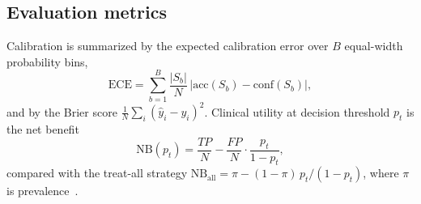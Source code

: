 \documentclass[conference]{IEEEtran}
\begin{document}
\subsection{Evaluation metrics}
Calibration is summarized by the expected calibration error over $B$ equal-width probability bins,
\begin{equation}
\mathrm{ECE}=\sum_{b=1}^{B}\frac{|S_b|}{N}\,\bigl|\mathrm{acc}(S_b)-\mathrm{conf}(S_b)\bigr|,
\end{equation}
and by the Brier score $\frac{1}{N}\sum_i(\hat y_i-y_i)^2$. Clinical utility at decision threshold $p_t$ is the net benefit
\begin{equation}
\mathrm{NB}(p_t)=\frac{TP}{N}-\frac{FP}{N}\cdot\frac{p_t}{1-p_t},
\end{equation}
compared with the treat-all strategy $\mathrm{NB}_{\mathrm{all}}=\pi-(1-\pi)\,p_t/(1-p_t)$, where $\pi$ is prevalence~\cite{vickers2006}.

\end{document}
